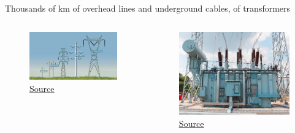 \begin{frame}
{Thousands of km of overhead lines and underground cables, of transformers}
\begin{columns}
\begin{figure}
\centering
\includegraphics[width=\linewidth]{images/hq_securite_1-filsdangereux-en1-reconnaitrelesfils_img4-en.jpg}
\caption*{\href{https://www.hydroquebec.com/safety/transmission-lines/understand-transmission-lines.html}{\underline{Source}}}
\end{figure}
\begin{figure}
\centering
\includegraphics[width=0.9\linewidth]{images/What_Specifically_is_a_Power_Transformer.jpeg}
\caption*{\href{https://www.bbntimes.com/society/common-reasons-for-use-power-transformers-in-residential-areas}{\underline{Source}}}
\end{figure}
\end{columns}
\end{frame}

